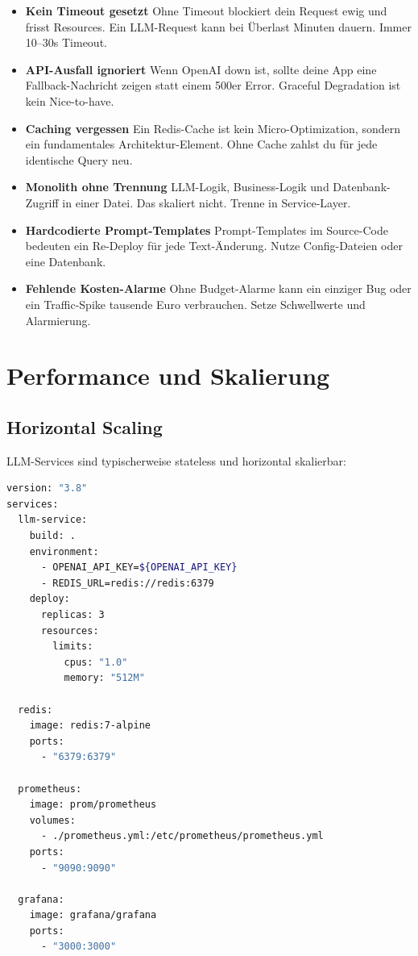 \begin{itemize}

    \item \textbf{Kein Timeout gesetzt} Ohne Timeout blockiert dein Request ewig und frisst Resources. Ein LLM-Request kann bei Überlast Minuten dauern. Immer 10--30s Timeout.
    \item \textbf{API-Ausfall ignoriert} Wenn OpenAI down ist, sollte deine App eine Fallback-Nachricht zeigen statt einem 500er Error. Graceful Degradation ist kein Nice-to-have.
    \item \textbf{Caching vergessen} Ein Redis-Cache ist kein Micro-Optimization, sondern ein fundamentales Architektur-Element. Ohne Cache zahlst du für jede identische Query neu.
    \item \textbf{Monolith ohne Trennung} LLM-Logik, Business-Logik und Datenbank-Zugriff in einer Datei. Das skaliert nicht. Trenne in Service-Layer.
    \item \textbf{Hardcodierte Prompt-Templates} Prompt-Templates im Source-Code bedeuten ein Re-Deploy für jede Text-Änderung. Nutze Config-Dateien oder eine Datenbank.
    \item \textbf{Fehlende Kosten-Alarme} Ohne Budget-Alarme kann ein einziger Bug oder ein Traffic-Spike tausende Euro verbrauchen. Setze Schwellwerte und Alarmierung.
\end{itemize}

\section{Performance und Skalierung}

\subsection{Horizontal Scaling}

LLM-Services sind typischerweise stateless und horizontal skalierbar:

\begin{lstlisting}[language=bash, caption=Docker Compose für skalierbaren LLM-Service]
version: "3.8"
services:
  llm-service:
    build: .
    environment:
      - OPENAI_API_KEY=${OPENAI_API_KEY}
      - REDIS_URL=redis://redis:6379
    deploy:
      replicas: 3
      resources:
        limits:
          cpus: "1.0"
          memory: "512M"

  redis:
    image: redis:7-alpine
    ports:
      - "6379:6379"

  prometheus:
    image: prom/prometheus
    volumes:
      - ./prometheus.yml:/etc/prometheus/prometheus.yml
    ports:
      - "9090:9090"

  grafana:
    image: grafana/grafana
    ports:
      - "3000:3000"
\end{lstlisting}

